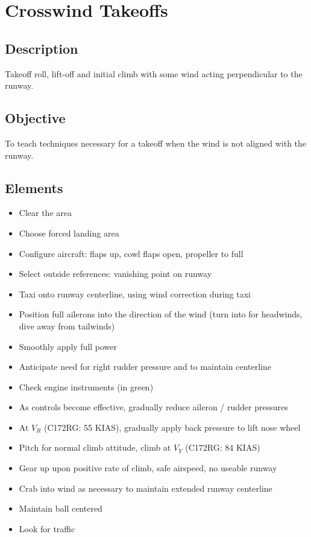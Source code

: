 \section{Crosswind Takeoffs}

\subsection{Description}

Takeoff roll, lift-off and initial climb with some wind acting perpendicular to
the runway.

\subsection{Objective}

To teach techniques necessary for a takeoff when the wind is not aligned with
the runway.

\subsection{Elements}

\begin{itemize}
  \item Clear the area
  \item Choose forced landing area
  \item Configure aircraft: flaps up, cowl flaps open, propeller to full
  \item Select outside references: vanishing point on runway
  \item Taxi onto runway centerline, using wind correction during taxi
  \item Position full ailerons into the direction of the wind (turn into for
    headwinds, dive away from tailwinds)
  \item Smoothly apply full power
  \item Anticipate need for right rudder pressure and to maintain centerline
  \item Check engine instruments (in green)
  \item As controls become effective, gradually reduce aileron / rudder
    pressures
  \item At $V_R$ (C172RG: 55 KIAS), gradually apply back pressure to lift nose
    wheel
  \item Pitch for normal climb attitude, climb at $V_Y$ (C172RG: 84 KIAS)
  \item Gear up upon positive rate of climb, safe airspeed, no useable runway
  \item Crab into wind as necessary to maintain extended runway centerline
  \item Maintain ball centered 
  \item Look for traffic
\end{itemize}

